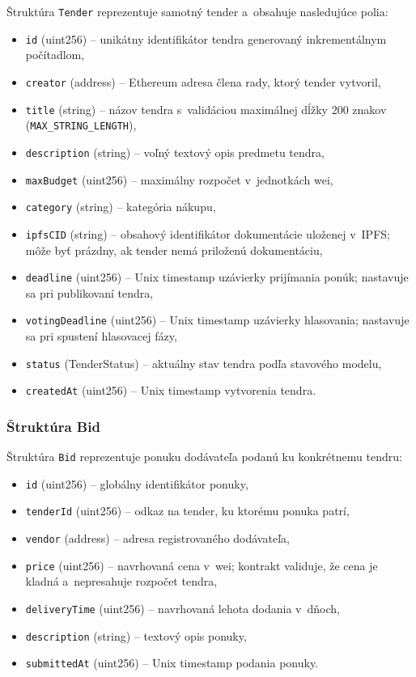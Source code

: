 Štruktúra \texttt{Tender} reprezentuje samotný tender a~obsahuje nasledujúce
polia:
\begin{itemize}
    \item \texttt{id} (uint256) -- unikátny identifikátor tendra generovaný
    inkrementálnym počítadlom,
    \item \texttt{creator} (address) -- Ethereum adresa člena rady, ktorý
    tender vytvoril,
    \item \texttt{title} (string) -- názov tendra s~validáciou maximálnej
    dĺžky 200 znakov (\texttt{MAX\_STRING\_LENGTH}),
    \item \texttt{description} (string) -- voľný textový opis predmetu tendra,
    \item \texttt{maxBudget} (uint256) -- maximálny rozpočet v~jednotkách wei,
    \item \texttt{category} (string) -- kategória nákupu,
    \item \texttt{ipfsCID} (string) -- obsahový identifikátor dokumentácie
    uloženej v~IPFS; môže byť prázdny, ak tender nemá priloženú
    dokumentáciu,
    \item \texttt{deadline} (uint256) -- Unix timestamp uzávierky prijímania
    ponúk; nastavuje sa pri publikovaní tendra,
    \item \texttt{votingDeadline} (uint256) -- Unix timestamp uzávierky
    hlasovania; nastavuje sa pri spustení hlasovacej fázy,
    \item \texttt{status} (TenderStatus) -- aktuálny stav tendra podľa
    stavového modelu,
    \item \texttt{createdAt} (uint256) -- Unix timestamp vytvorenia tendra.
\end{itemize}

\subsubsection{Štruktúra Bid}

Štruktúra \texttt{Bid} reprezentuje ponuku dodávateľa podanú ku konkrétnemu
tendru:
\begin{itemize}
    \item \texttt{id} (uint256) -- globálny identifikátor ponuky,
    \item \texttt{tenderId} (uint256) -- odkaz na tender, ku ktorému ponuka
    patrí,
    \item \texttt{vendor} (address) -- adresa registrovaného dodávateľa,
    \item \texttt{price} (uint256) -- navrhovaná cena v~wei; kontrakt
    validuje, že cena je kladná a~nepresahuje rozpočet tendra,
    \item \texttt{deliveryTime} (uint256) -- navrhovaná lehota dodania
    v~dňoch,
    \item \texttt{description} (string) -- textový opis ponuky,
    \item \texttt{submittedAt} (uint256) -- Unix timestamp podania ponuky.
\end{itemize}

